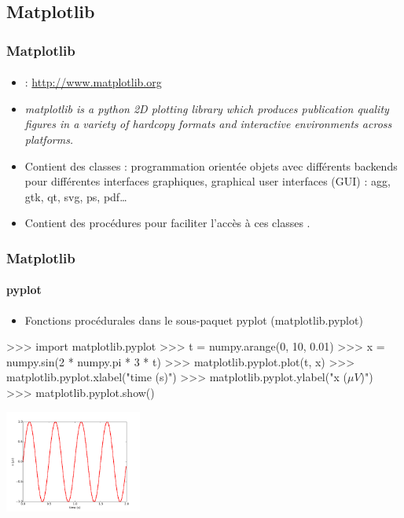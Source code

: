 \subsection{Matplotlib}
\begin{frame}[fragile]
\frametitle{Matplotlib}
\framesubtitle{}
\begin{itemize}
 \item {} : \url{http://www.matplotlib.org}
 \item \emph{matplotlib is a python 2D plotting library which produces publication quality figures in a variety of hardcopy formats and interactive environments across platforms. }
 \item Contient des classes : programmation orientée objets avec différents backends pour différentes interfaces graphiques, graphical user interfaces (GUI) : agg, gtk, qt, svg, ps, pdf\dots
 \item Contient des procédures pour faciliter l'accès à ces classes . 
\end{itemize}
\end{frame}
\begin{frame}[fragile]
\frametitle{Matplotlib}
\framesubtitle{pyplot}
\begin{itemize}
 \item Fonctions procédurales dans le sous-paquet pyplot (matplotlib.pyplot)
\end{itemize}
\begin{pythonConsole}
>>> import matplotlib.pyplot
>>> t = numpy.arange(0, 10, 0.01)
>>> x = numpy.sin(2 * numpy.pi * 3 * t)
>>> matplotlib.pyplot.plot(t, x)
>>> matplotlib.pyplot.xlabel("time (s)")
>>> matplotlib.pyplot.ylabel("x ($\mu V$)")
>>> matplotlib.pyplot.show()
\end{pythonConsole}
\begin{center}
 \includegraphics[width=4.5cm]{./fig/matplotlibSinus.pdf}
\end{center}
\end{frame}
